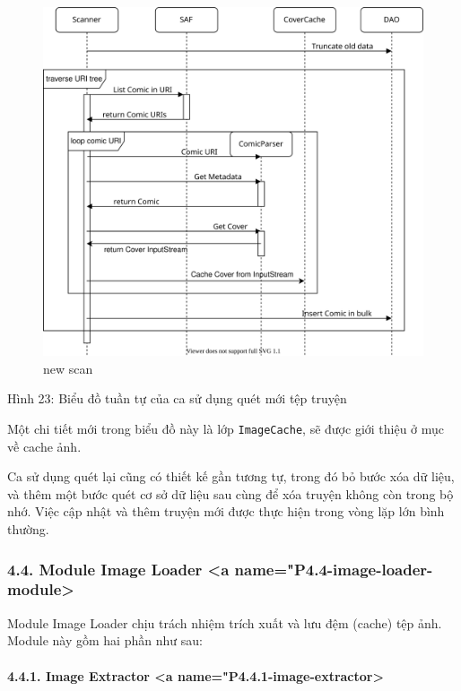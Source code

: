 \documentclass[
]{article}
\begin{document}
\begin{figure}
\centering
\includegraphics{../images/scan_new_sequence.svg}
\caption{new scan}
\end{figure}

Hình 23: Biểu đồ tuần tự của ca sử dụng quét mới tệp truyện

Một chi tiết mới trong biểu đồ này là lớp \texttt{ImageCache}, sẽ được
giới thiệu ở mục về cache ảnh.

Ca sử dụng quét lại cũng có thiết kế gần tương tự, trong đó bỏ bước xóa
dữ liệu, và thêm một bước quét cơ sở dữ liệu sau cùng để xóa truyện
không còn trong bộ nhớ. Việc cập nhật và thêm truyện mới được thực hiện
trong vòng lặp lớn bình thường.

\hypertarget{module-image-loader-a-namep4.4-image-loader-module}{%
\subsubsection{4.4. Module Image Loader \textless a
name="P4.4-image-loader-module\textgreater{}}\label{module-image-loader-a-namep4.4-image-loader-module}}

Module Image Loader chịu trách nhiệm trích xuất và lưu đệm (cache) tệp
ảnh. Module này gồm hai phần như sau:

\hypertarget{image-extractor-a-namep4.4.1-image-extractor}{%
\paragraph{4.4.1. Image Extractor \textless a
name="P4.4.1-image-extractor\textgreater{}}\label{image-extractor-a-namep4.4.1-image-extractor}}
\end{document}
